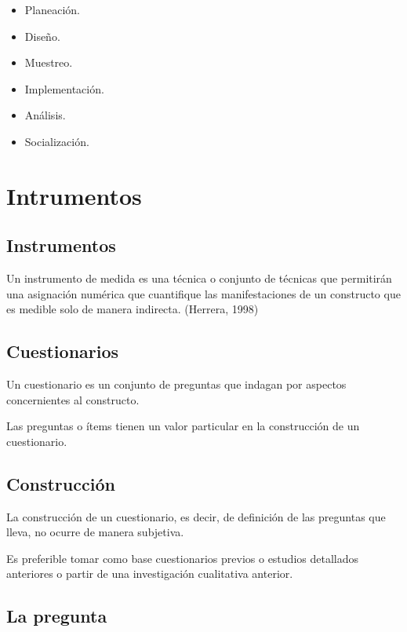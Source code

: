 \documentclass[
  letterpaper,
  DIV=11,
  numbers=noendperiod]{scrreprt}
\providecommand{\tightlist}{%
  \setlength{\itemsep}{0pt}\setlength{\parskip}{0pt}}\usepackage{longtable,booktabs,array}
\begin{document}
\begin{itemize}
\tightlist
\item
  Planeación.
\item
  Diseño.
\item
  Muestreo.
\item
  Implementación.
\item
  Análisis.
\item
  Socialización.
\end{itemize}


\chapter{Intrumentos}\label{intrumentos}

\section{Instrumentos}\label{instrumentos}

Un instrumento de medida es una técnica o conjunto de técnicas que
permitirán una asignación numérica que cuantifique las manifestaciones
de un constructo que es medible solo de manera indirecta. (Herrera,
1998)

\section{Cuestionarios}\label{cuestionarios}

Un cuestionario es un conjunto de preguntas que indagan por aspectos
concernientes al constructo.

Las preguntas o ítems tienen un valor particular en la construcción de
un cuestionario.

\section{Construcción}\label{construcciuxf3n}

La construcción de un cuestionario, es decir, de definición de las
preguntas que lleva, no ocurre de manera subjetiva.

Es preferible tomar como base cuestionarios previos o estudios
detallados anteriores o partir de una investigación cualitativa
anterior.

\section{La pregunta}\label{la-pregunta}
\end{document}
